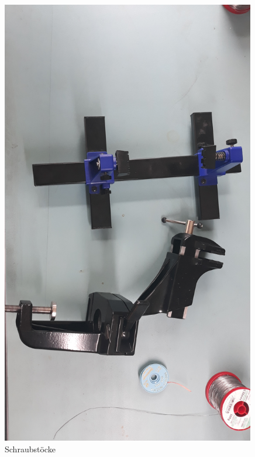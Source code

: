 \documentclass[12pt, a4paper]{article}		%
\begin{document}
\begin{minipage}[t]{0.49\textwidth}
\begin{figure}[H]
	\centering
		\includegraphics[width=0.99\textwidth]{Grafiken/20200726_121444.jpg}
	\caption{Schraubstöcke}
	\label{fig:20200726_121444}
\end{figure}
\end{minipage}
\end{document}
